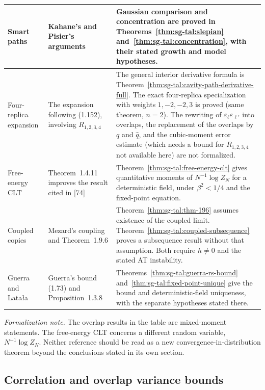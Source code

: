 \begin{center}
\begin{tabular}{|p{}|p{}|p{}|}
\hline
Smart paths & Kahane's and Pisier's arguments & Gaussian comparison and concentration are proved in Theorems~\ref{thm:sg-tal:slepian} and~\ref{thm:sg-tal:concentration}, with their stated growth and model hypotheses. \\
\hline
Four-replica expansion & The expansion following (1.152), involving $R_{1,2,3,4}$ & The general interior derivative formula is Theorem~\ref{thm:sg-tal:cavity-path-derivative-full}. The exact four-replica specialization with weights $1,-2,-2,3$ is proved (same theorem, $n=2$). The rewriting of $\varepsilon_\ell\varepsilon_{\ell'}$ into overlaps, the replacement of the overlaps by $q$ and $\hat q$, and the cubic-moment error estimate (which needs a bound for $R_{1,2,3,4}$ not available here) are not formalized. \\
\hline
Free-energy CLT & Theorem~1.4.11 improves the result cited in [74] & Theorem~\ref{thm:sg-tal:free-energy-clt} gives quantitative moments of $N^{-1}\log Z_N$ for a deterministic field, under $\beta^2<1/4$ and the fixed-point equation. \\
\hline
Coupled copies & Mezard's coupling and Theorem~1.9.6 & Theorem~\ref{thm:sg-tal:thm-196} assumes existence of the coupled limit. Theorem~\ref{thm:sg-tal:coupled-subsequence} proves a subsequence result without that assumption. Both require $h\ne0$ and the stated AT instability. \\
\hline
Guerra and Lata\l{}a & Guerra's bound (1.73) and Proposition~1.3.8 & Theorems~\ref{thm:sg-tal:guerra-rs-bound} and~\ref{thm:sg-tal:fixed-point-unique} give the bound and deterministic-field uniqueness, with the separate hypotheses stated there. \\
\hline
\end{tabular}
\end{center}

\emph{Formalization note.} The overlap results in the table are mixed-moment statements.
The free-energy CLT concerns a different random variable, $N^{-1}\log Z_N$.
Neither reference should be read as a new convergence-in-distribution theorem beyond the
conclusions stated in its own section.

\subsection{Correlation and overlap variance bounds}

